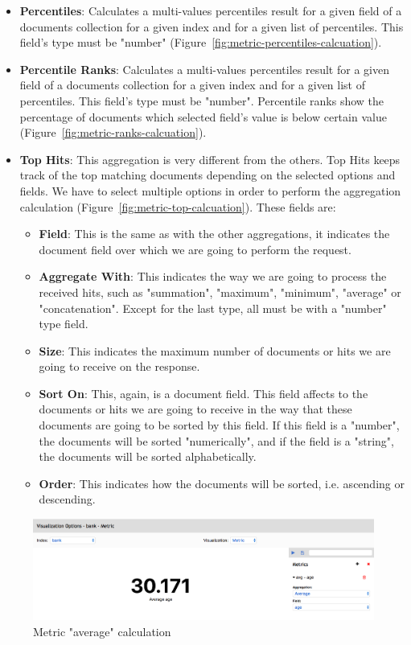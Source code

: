 \documentclass[a4paper, 12pt, english]{book}
\begin{document}
\begin{itemize}
    \item \textbf{Percentiles}: Calculates a multi-values percentiles result for a given field of a documents collection for a given index and for a given list of percentiles. This field's type must be "number" (Figure~\ref{fig:metric-percentiles-calcuation}).
    \item \textbf{Percentile Ranks}: Calculates a multi-values percentiles result for a given field of a documents collection for a given index and for a given list of percentiles. This field's type must be "number". Percentile ranks show the percentage of documents which selected field's value is below certain value (Figure~\ref{fig:metric-ranks-calcuation}).
    \item \textbf{Top Hits}: This aggregation is very different from the others. Top Hits keeps track of the top matching documents depending on the selected options and fields. We have to select multiple options in order to perform the aggregation calculation (Figure~\ref{fig:metric-top-calcuation}). These fields are:
    \begin{itemize}
        \item \textbf{Field}: This is the same as with the other aggregations, it indicates the document field over which we are going to perform the request.
        \item \textbf{Aggregate With}: This indicates the way we are going to process the received hits, such as "summation", "maximum", "minimum", "average" or "concatenation". Except for the last type, all must be with a "number" type field.
        \item \textbf{Size}: This indicates the maximum number of documents or hits we are going to receive on the response.
        \item \textbf{Sort On}: This, again, is a document field. This field affects to the documents or hits we are going to receive in the way that these documents are going to be sorted by this field. If this field is a "number", the documents will be sorted "numerically", and if the field is a "string", the documents will be sorted alphabetically.
        \item \textbf{Order}: This indicates how the documents will be sorted, i.e. ascending or descending.
    \end{itemize}
\end{itemize}

\begin{figure}
  \centering
  \includegraphics[width=13cm, keepaspectratio]{img/metric-average-calculation.png}
  \caption{Metric "average" calculation}
  \label{fig:metric-average-calcuation}
\end{figure}
\end{document}
